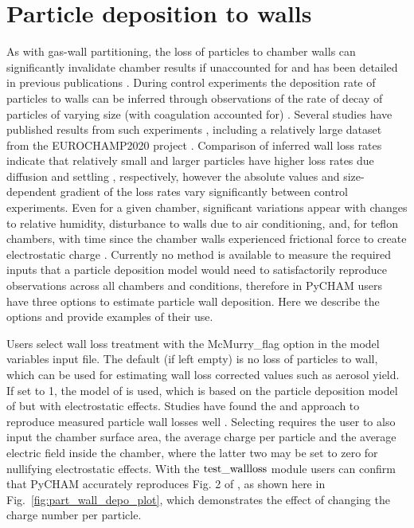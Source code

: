 \documentclass[gmd, manuscript]{copernicus}
\begin{document}
\section{Particle deposition to walls}\label{sec:part2wall}

As with gas-wall partitioning, the loss of particles to chamber walls can significantly invalidate chamber results if unaccounted for and has been detailed in previous publications \citep{Crump1981, McMurry1985, Nah2017, Wang2018}.  During control experiments the deposition rate of particles to walls can be inferred through observations of the rate of decay of particles of varying size (with coagulation accounted for) \citep{Charan2019}.  Several studies have published results from such experiments \citep{McMurry1985, Wang2018}, including a relatively large dataset from the EUROCHAMP2020 project \citep{EUROCHAMP2020}.  Comparison of inferred wall loss rates indicate that relatively small and larger particles have higher loss rates due diffusion and settling \citep{Crump1981}, respectively, however the absolute values and size-dependent gradient of the loss rates vary significantly between control experiments.  Even for a given chamber, significant variations appear with changes to relative humidity, disturbance to walls due to air conditioning, and, for teflon chambers, with time since the chamber walls experienced frictional force to create electrostatic charge \citep{Wang2018}.  Currently no method is available to measure the required inputs that a particle deposition model would need to satisfactorily reproduce observations across all chambers and conditions, therefore in PyCHAM users have three options to estimate particle wall deposition.  Here we describe the options and provide examples of their use.

Users select wall loss treatment with the McMurry\_flag option in the model variables input file.  The default (if left empty) is no loss of particles to wall, which can be used for estimating wall loss corrected values such as aerosol yield.  If set to 1, the model of \citet{McMurry1985} is used, which is based on the particle deposition model of \citet{Crump1981} but with electrostatic effects.  Studies have found the \citet{Crump1981} and \citet{McMurry1985} approach to reproduce measured particle wall losses well \citep{Chen1992, Kim2001}.  Selecting \citet{McMurry1985} requires the user to also input the chamber surface area, the average charge per particle and the average electric field inside the chamber, where the latter two may be set to zero for nullifying electrostatic effects.  With the $\rm{test\_wallloss}$ module users can confirm that PyCHAM accurately reproduces Fig. 2 of \citet{McMurry1985}, as shown here in Fig.~\ref{fig:part_wall_depo_plot}, which demonstrates the effect of changing the charge number per particle.
\end{document}
